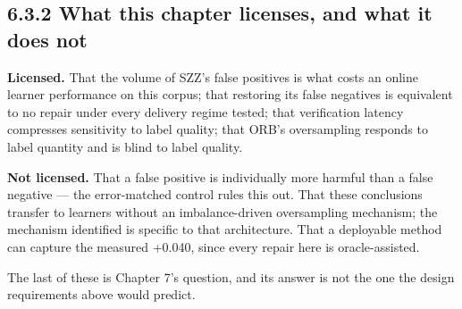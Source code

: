 \subsection{6.3.2 What this chapter licenses, and what it does
not}\label{what-this-chapter-licenses-and-what-it-does-not}

\textbf{Licensed.} That the volume of SZZ's false positives is what
costs an online learner performance on this corpus; that restoring its
false negatives is equivalent to no repair under every delivery regime
tested; that verification latency compresses sensitivity to label
quality; that ORB's oversampling responds to label quantity and is blind
to label quality.

\textbf{Not licensed.} That a false positive is individually more
harmful than a false negative --- the error-matched control rules this
out. That these conclusions transfer to learners without an
imbalance-driven oversampling mechanism; the mechanism identified is
specific to that architecture. That a deployable method can capture the
measured +0.040, since every repair here is oracle-assisted.

The last of these is Chapter 7's question, and its answer is not the one
the design requirements above would predict.
